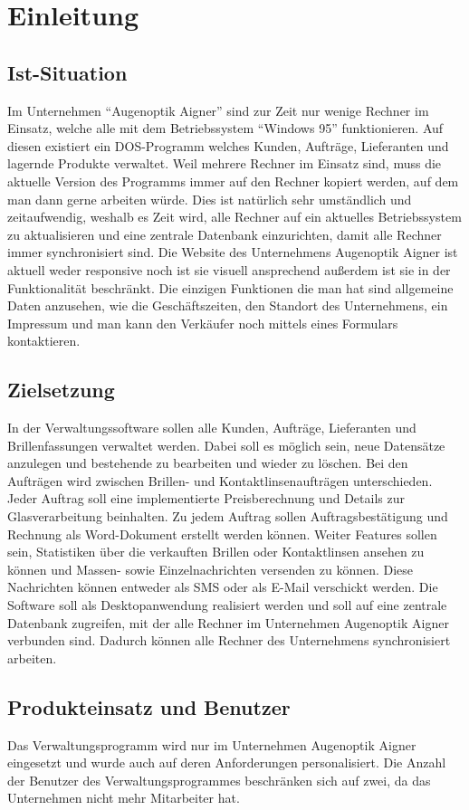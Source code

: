 \chapter{Einleitung}
\section{Ist-Situation}
Im Unternehmen “Augenoptik Aigner” sind zur Zeit nur wenige Rechner im Einsatz, welche alle mit dem Betriebssystem “Windows 95” funktionieren. Auf diesen existiert ein DOS-Programm welches Kunden,  Aufträge, Lieferanten und lagernde Produkte  verwaltet. Weil mehrere Rechner im Einsatz sind, muss die aktuelle Version des Programms immer auf den Rechner kopiert werden, auf dem man dann gerne arbeiten würde. Dies ist natürlich sehr umständlich und zeitaufwendig, weshalb es Zeit wird, alle Rechner auf ein aktuelles Betriebssystem zu aktualisieren und eine zentrale Datenbank einzurichten, damit alle Rechner immer synchronisiert sind.\newline
Die Website des Unternehmens Augenoptik Aigner ist aktuell weder responsive noch ist sie visuell ansprechend außerdem ist sie in der Funktionalität beschränkt. Die einzigen Funktionen die man hat sind allgemeine Daten anzusehen, wie die Geschäftszeiten, den Standort des Unternehmens, ein Impressum und man kann den Verkäufer noch mittels eines Formulars kontaktieren. 

\section{Zielsetzung}
In der Verwaltungssoftware sollen alle Kunden, Aufträge, Lieferanten und Brillenfassungen verwaltet werden. Dabei soll es möglich sein, neue Datensätze anzulegen und bestehende zu bearbeiten und wieder zu löschen. Bei den Aufträgen wird zwischen Brillen- und Kontaktlinsenaufträgen unterschieden. Jeder Auftrag soll eine implementierte Preisberechnung und Details zur Glasverarbeitung beinhalten. Zu jedem Auftrag sollen Auftragsbestätigung und Rechnung als Word-Dokument erstellt werden können. \newline Weiter Features sollen sein, Statistiken über die verkauften Brillen oder Kontaktlinsen ansehen zu können und Massen- sowie Einzelnachrichten versenden zu können. Diese Nachrichten können entweder als SMS oder als E-Mail verschickt werden. \newline Die Software soll als Desktopanwendung realisiert werden und soll auf eine zentrale Datenbank zugreifen, mit der alle Rechner im Unternehmen Augenoptik Aigner verbunden sind. Dadurch können alle Rechner des Unternehmens synchronisiert arbeiten.

\section{Produkteinsatz und Benutzer}
Das Verwaltungsprogramm wird nur im Unternehmen Augenoptik Aigner eingesetzt und wurde auch auf deren Anforderungen personalisiert. Die Anzahl der Benutzer des Verwaltungsprogrammes beschränken sich auf zwei, da das Unternehmen nicht mehr Mitarbeiter hat.



